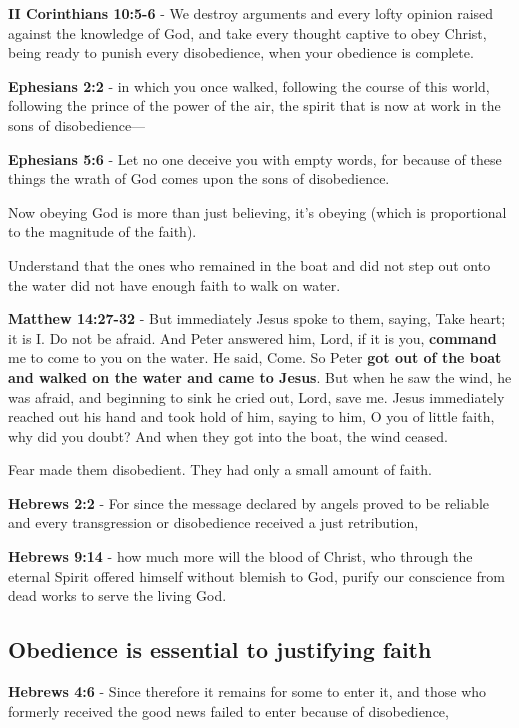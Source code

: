 \documentclass[11pt]{article}
\begin{document}
\textbf{II Corinthians 10:5-6} - We destroy arguments and every lofty opinion raised against the knowledge of God, and take every thought captive to obey Christ, being ready to punish every disobedience, when your obedience is complete.

\textbf{Ephesians 2:2} - in which you once walked, following the course of this world, following the prince of the power of the air, the spirit that is now at work in the sons of disobedience—

\textbf{Ephesians 5:6} - Let no one deceive you with empty words, for because of these things the wrath of God comes upon the sons of disobedience.

Now obeying God is more than just believing, it's obeying (which is proportional to the magnitude of the faith).

Understand that the ones who remained in the boat and did not step out onto the water did not have enough faith to walk on water.

\textbf{Matthew 14:27-32} - But immediately Jesus spoke to them, saying, Take heart; it is I. Do not be afraid. And Peter answered him, Lord, if it is you, \textbf{command} me to come to you on the water. He said, Come. So Peter \textbf{got out of the boat and walked on the water and came to Jesus}. But when he saw the wind, he was afraid, and beginning to sink he cried out, Lord, save me. Jesus immediately reached out his hand and took hold of him, saying to him, O you of little faith, why did you doubt? And when they got into the boat, the wind ceased.

Fear made them disobedient. They had only a small amount of faith.

\textbf{Hebrews 2:2} - For since the message declared by angels proved to be reliable and every transgression or disobedience received a just retribution,

\textbf{Hebrews 9:14} - how much more will the blood of Christ, who through the eternal Spirit offered himself without blemish to God, purify our conscience from dead works to serve the living God.

\subsection{Obedience is essential to justifying faith}
\label{sec:org00df230}
\textbf{Hebrews 4:6} - Since therefore it remains for some to enter it, and those who formerly received the good news failed to enter because of disobedience,
\end{document}
